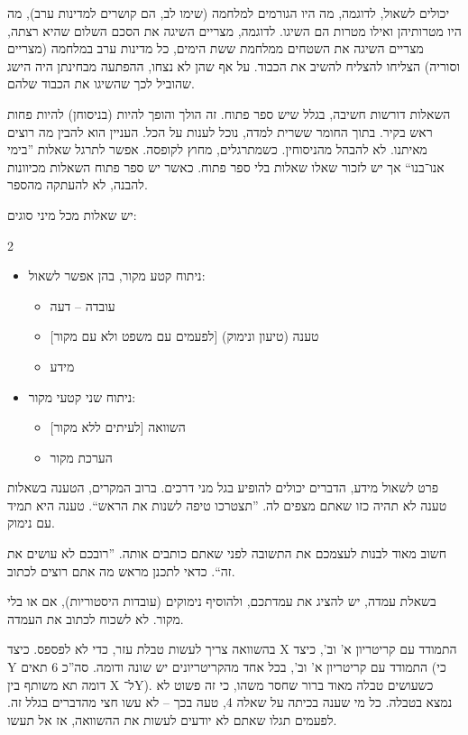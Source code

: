 \documentclass[]{../../../../tex/classes/styledArticle}
\begin{document}
	יכולים לשאול, לדוגמה, מה היו הגורמים למלחמה (שימו לב, הם קושרים למדינות ערב), מה היו מטרותיהן ואילו מטרות הם השיגו. לדוגמה, מצריים השיגה את הסכם השלום שהיא רצתה, מצריים השיגה את השטחים ממלחמת ששת הימים, כל מדינות ערב במלחמה (מצריים וסוריה) הצליחו להצליח להשיב את הכבוד. על אף שהן לא נצחו, ההפתעה מבחינתן היה הישג שהוביל לכך שהשיגו את הכבוד שלהם. 
	
	
	השאלות דורשות חשיבה, בגלל שיש ספר פתוח. זה הולך והופך להיות (בניסוחן) להיות פחות ראש בקיר. בתוך החומר ששרית למדה, נוכל לענות על הכל. העניין הוא להבין מה רוצים מאיתנו. לא להבהל מהניסוחין. כשמתרגלים, מחוץ לקופסה. אפשר לתרגל שאלות ''בימי אנו־בנו`` אך יש לזכור שאלו שאלות בלי ספר פתוח. כאשר יש ספר פתוח השאלות מכיוונות להבנה, לא להעתקה מהספר. 
	
	יש שאלות מכל מיני סוגים: 
	\begin{multicols}{2}
		\begin{itemize}
			\item ניתוח קטע מקור, בהן אפשר לשאול: 
			\begin{itemize}
				\item עובדה – דעה
				\item טענה (טיעון ונימוק) [לפעמים עם משפט ולא עם מקור]
				\item מידע
			\end{itemize}
			\item ניתוח שני קטעי מקור:
			\begin{itemize}
				\item השוואה [לעיתים ללא מקור]
				\item הערכת מקור
			\end{itemize}
		\end{itemize}
	\end{multicols}
	פרט לשאול מידע, הדברים יכולים להופיע בגל מני דרכים. ברוב המקרים, הטענה בשאלות טענה לא תהיה כזו שאתם מצפים לה. ''תצטרכו טיפה לשנות את הראש``. טענה היא תמיד עם נימוק. 
	
	חשוב מאוד לבנות לעצמכם את התשובה לפני שאתם כותבים אותה. ''רובכם לא עושים את זה``. כדאי לתכנן מראש מה אתם רוצים לכתוב. 
	
	בשאלת עמדה, יש להציג את עמדתכם, ולהוסיף נימוקים (עובדות היסטוריות), אם או בלי מקור. לא לשכוח לכתוב את העמדה. 
	
	בהשוואה צריך לעשות טבלת עזר, כדי לא לפספס. כיצד X התמודד עם קריטריון א' וב', כיצד Y התמודד עם קריטריון א' וב', בכל אחד מהקריטריונים יש שונה ודומה. סה''כ 6 תאים (כי דומה תא משותף בין X ל־Y). כשעושים טבלה מאוד ברור שחסר משהו, כי זה פשוט לא נמצא בטבלה. כל מי שענה בכיתה על שאלה 4, טעה בכך – לא עשו חצי מהדברים בגלל זה. לפעמים תגלו שאתם לא יודעים לעשות את ההשוואה, אז אל תעשו. 
	
\end{document}
